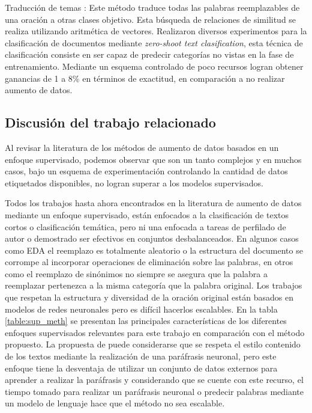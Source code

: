 Traducción de temas \citep{zhang2019integrating}: Este método traduce todas las palabras reemplazables de una oración a otras clases objetivo. Esta búsqueda de relaciones de similitud se realiza utilizando aritmética de vectores. Realizaron diversos experimentos para la clasificación de documentos mediante \textit{zero-shoot text clasification}, esta técnica de clasificación consiste en ser capaz de predecir categorías no vistas en la fase de entrenamiento. Mediante un esquema controlado de poco recursos logran obtener ganancias de 1 a 8\% en términos de exactitud, en comparación a no realizar aumento de datos.


\subsection{Discusión del trabajo relacionado}

Al revisar la literatura de los métodos de aumento de datos basados en un enfoque supervisado, podemos observar que son un tanto complejos y en muchos casos, bajo un esquema de experimentación controlando la cantidad de datos etiquetados disponibles, no logran superar a los modelos supervisados.

Todos los trabajos hasta ahora encontrados en la literatura de aumento de datos mediante un enfoque supervisado, están enfocados a la clasificación de textos cortos o clasificación temática,  pero ni una enfocada a tareas de perfilado de autor o demostrado ser efectivos en conjuntos desbalanceados. En algunos casos como EDA el reemplazo es totalmente aleatorio o la estructura del documento se corrompe al incorporar operaciones de eliminación sobre las palabras, en otros como el reemplazo de sinónimos no siempre se asegura que la palabra a reemplazar pertenezca a la misma categoría que la palabra original. Los trabajos que respetan la estructura y diversidad de la oración original están basados en modelos de redes neuronales pero es difícil hacerlos escalables. En la tabla \ref{table:sup_meth} se presentan las principales características de los diferentes enfoques supervisados relevantes para este trabajo en comparación con el método propuesto. La propuesta de \cite{kumar2019submodular} puede considerarse que se respeta el estilo  contenido de los textos mediante la realización de una paráfrasis neuronal, pero este enfoque tiene la desventaja de utilizar un conjunto de datos externos para aprender a realizar la paráfrasis y considerando que se cuente con este recurso, el tiempo tomado para realizar un paráfrasis neuronal o predecir palabras mediante un modelo de lenguaje hace que el método no sea escalable.

